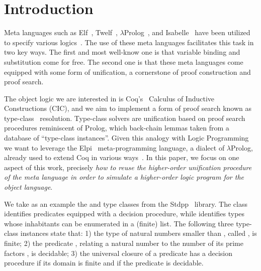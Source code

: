 \documentclass[sigconf,natbib=false,review]{acmart}
\begin{document}

\maketitle

\section{Introduction}
\label{sec:intro}

Meta languages such as Elf~\cite{elf}, Twelf~\cite{twelf},
$\lambda$Prolog~\cite{miller_nadathur_2012}, and
Isabelle~\cite{10.1007/978-3-540-71067-7_7}
have been utilized to specify various
logics~\cite{felty88cade,books/sp/NipkowPW02,10.1007/BF00881873,felty93lics}.
The use of these meta languages facilitates this task in two
key ways. The first and most well-know one is that variable binding and
substitution come for free. %
The second one is that these meta languages come equipped with some form
of unification, a cornerstone of proof construction and proof search.

The object logic we are interested in is Coq's~\cite{Coq-refman}
Calculus of Inductive Constructions (CIC), and we aim to implement a
form of proof search known as type-class~\cite{wadler89,sozeau08} resolution.
Type-class solvers are unification based on proof search procedures
reminiscent of Prolog, which back-chain lemmas taken
from a database of ``type-class instances''. Given this
analogy with Logic Programming we want to leverage the
Elpi~\cite{tassi:hal-01637063} meta-programming language,
a dialect of $\lambda$Prolog, already used to extend
Coq in various ways~\cite{tassi:hal-01637063,tassi:hal-01897468,gregoire:hal-03800154,newtc}.
In this paper, we focus on one aspect of
this work, precisely \emph{how to reuse the higher-order unification procedure
of the meta language in order to simulate a higher-order logic program
for the object language}.

We take as an example the  and  type classes
from the Stdpp~\cite{JUNG_KREBBERS_JOURDAN_BIZJAK_BIRKEDAL_DREYER_2018}
library. The class  
identifies predicates equipped with a decision procedure, while
 identifies types whose inhabitants can be enumerated in a (finite) list.
The following three type-class instances state that:
1) the type of natural numbers smaller than , called ,
is finite;
2) the predicate , relating a natural number
 to the number of its prime factors , is decidable;
3) the universal closure of a predicate has a decision procedure if
its domain is finite and if the predicate is decidable.
\end{document}

